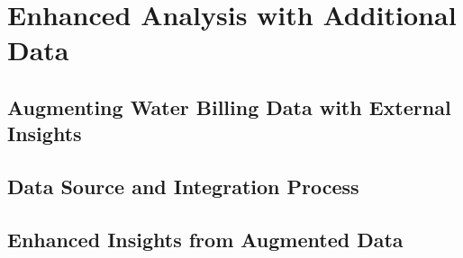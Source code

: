 \chapter{Enhanced Analysis with Additional Data}

\section{Augmenting Water Billing Data with External Insights}

\section{Data Source and Integration Process}

\section{Enhanced Insights from Augmented Data}